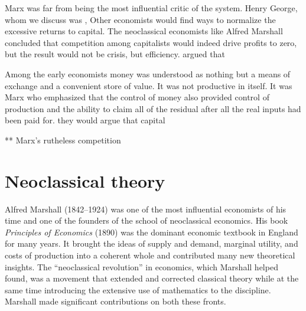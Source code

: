 Marx was far from being the most influential critic of the system. Henry George, whom we discuss was ,  Other economists  would find ways to normalize the  excessive returns to capital. The neoclassical economists like Alfred Marshall concluded that competition among capitalists  would indeed drive profits to zero, but the result would not be crisis, but efficiency. argued that  

Among the early economists money was understood as nothing but a means of exchange and a convenient store of value. It was not productive in itself. It was Marx who emphasized that the control of money also provided control of production and the ability to claim all of the residual after all the real inputs had been paid for. 
they would argue that capital 

** Marx's rutheless competition



\section{Neoclassical theory }

Alfred Marshall (1842--1924) was one of the most influential economists of his time and one of the founders of the school of neoclassical economics. His book \textit{Principles of Economics} (1890) \cite{marshallPrinciplesEconomics1890} was the dominant economic textbook in England for many years. It brought the ideas of supply and demand, marginal utility, and costs of production into a coherent whole and contributed many new theoretical insights. 
The ``neoclassical revolution'' in economics, which Marshall helped found, was a movement that extended and corrected classical theory while at the same time introducing the extensive use of mathematics to the discipline. Marshall made significant contributions on both these fronts. 

